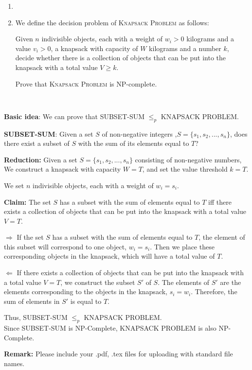 \documentclass[12pt,a4paper]{article}
\makeatletter
\newtheorem*{solution}{Solution}
\theoremstyle{definition}
\renewenvironment{solution}[1][Solution] {\par\pushQED{\qed}\normalfont\topsep6\p@\@plus6\p@\relax\trivlist\item[\hskip\labelsep\bfseries#1\@addpunct{.}]\ignorespaces}{\popQED\endtrivlist\@endpefalse} \makeatother
\makeatother
\begin{document}
\begin{enumerate}
\begin{solution}
\begin{enumerate}
    
\end{enumerate}

    \end{solution}
    \item We define the decision problem of \textsc{Knapsack Problem} as follows:
    
        Given $n$ indivisible objects, each with a weight of $w_i>0$ kilograms and a value $v_i>0$, a knapsack with capacity of $W$ kilograms and a number $k$, decide whether there is a collection of objects that can be put into the knapsack with a total value $V\geqslant k$.
        
    Prove that \textsc{Knapsack Problem} is NP-complete.
    
\end{enumerate}

\begin{solution}
~\\
\par
    \textbf{Basic idea}: We can prove that SUBSET-SUM $\leq_p$ KNAPSACK PROBLEM.
    
    
    \textbf{SUBSET-SUM}: Given a set $S$ of non-negative integers ,$S=\{s_1,s_2,...,s_n\}$, does there exist a subset of $S$ with the sum of its elements equal to $T$?
    
    \textbf{Reduction:}
    Given a set $S=\{s_1,s_2,...,s_n\}$ consisting of non-negative numbers, We construct a knapsack with capacity $W=T$, and set the value threshold $k=T$. 
    
    We set $n$ indivisible objects, each with a weight of $w_i=s_i$.
    
    \textbf{Claim:}
    The set $S$ has a subset with the sum of elements equal to $T$ iff there exists a collection of objects that can be put into the knapsack with a total value $V=T$.
    
    $\Rightarrow$ If the set $S$ has a subset with the sum of elements equal to $T$, the element of this subset will correspond to one object, $w_i=s_i$. Then we place these corresponding objects in the knapsack, which will have a total value of $T$.
    
    $\Leftarrow$ If there exists a collection of objects that can be put into the knapsack with a total value $V=T$, we construct the subset $S'$ of $S$. The elements of $S'$ are the  elements corresponding to the objects in the knapsack, $s_i=w_i$. Therefore, the sum of elements in $S'$ is equal to $T$.
    
    Thus, SUBSET-SUM $\leq_p$ KNAPSACK PROBLEM.
    ~\\
    
    Since SUBSET-SUM is NP-Complete, KNAPSACK PROBLEM is also NP-Complete.
    
    
    
    
    
    
    
    
\end{solution}
\textbf{Remark:} Please include your .pdf, .tex files for uploading with standard file names.
\newpage


\end{document}
